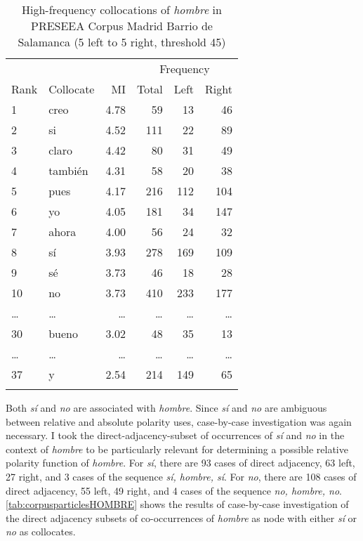 \begin{table}
	\begin{tabular}{ll *4{r}}
		\lsptoprule
		     &           &    & \multicolumn{3}{c}{Frequency}\\\cmidrule(lr){4-6}
		Rank & Collocate & MI & Total & Left& Right\\\midrule
		1 & creo & 4.78 & 59 & 13 & 46 \\
		2 & si & 4.52 & 111 & 22 & 89 \\
		3 & claro & 4.42 & 80 & 31 & 49 \\
		4 & también & 4.31 & 58 & 20 & 38 \\
		5 & pues & 4.17 & 216 & 112 & 104 \\
		6 & yo & 4.05 & 181 & 34 & 147 \\
		7 & ahora & 4.00 & 56 & 24 & 32 \\
		8 & sí & 3.93 & 278 & 169 & 109 \\
		9 & sé & 3.73 & 46 & 18 & 28 \\
		10 & no & 3.73 & 410 & 233 & 177 \\
		\ldots & \ldots & \ldots & \ldots & \ldots & \ldots \\
		30 & bueno & 3.02 & 48 & 35 & 13 \\
		\ldots & \ldots & \ldots & \ldots & \ldots & \ldots \\
		37 & y & 2.54 & 214 & 149 & 65 \\		
		\lspbottomrule 
	\end{tabular}
	\caption[Collocations of \textit{hombre}]{High-frequency collocations of \textit{hombre} in PRESEEA Corpus Madrid Barrio de Salamanca (5 left to 5 right, threshold 45)}
	\label{tab:associationmeasuresMIhombre}
\end{table}

Both \textit{sí} and \textit{no} are associated with \textit{hombre}. Since \textit{sí} and \textit{no} are ambiguous between relative and absolute polarity uses, case-by-case investigation was again necessary. I took the direct-adjacency-subset of occurrences of \textit{sí} and \textit{no} in the context of \textit{hombre} to be particularly relevant for determining a possible relative polarity function of \textit{hombre}. For \textit{sí}, there are 93 cases of direct adjacency, 63 left, 27 right, and 3 cases of the sequence \textit{sí, hombre, sí}. For \textit{no}, there are 108 cases of direct adjacency, 55 left, 49 right, and 4 cases of the sequence \textit{no, hombre, no}. \autoref{tab:corpusparticlesHOMBRE} shows the results of case-by-case investigation of the direct adjacency subsets of co-occurrences of \textit{hombre} as node with either \textit{sí} or \textit{no} as collocates.

